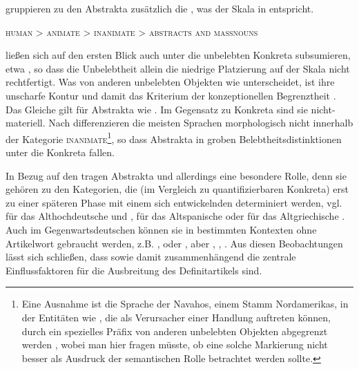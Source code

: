 \textcite[194]{Enger2011} gruppieren zu den Abstrakta  zusätzlich die  , was der Skala in  entspricht. 

\begin{exe}
	\ex \label{ex:einfachbelebt} \textsc{human > animate > inanimate  > abstracts and massnouns}
	\end{exe}
\noindent
{} ließen sich auf den ersten Blick auch unter die unbelebten  Konkreta  subsumieren, etwa , so dass die Unbelebtheit  allein die niedrige Platzierung auf der Skala nicht rechtfertigt. Was  von anderen unbelebten  Objekten wie  unterscheidet, ist ihre unscharfe Kontur und damit das Kriterium der konzeptionellen Begrenztheit \parencite[203--207]{Langacker1987}. Das Gleiche gilt für Abstrakta  wie . Im Gegensatz zu  Konkreta sind sie nicht-materiell. Nach \textcite[197]{Comrie1989} differenzieren die meisten Sprachen morphologisch nicht innerhalb der Kategorie \textsc{inanimate}\footnote{Eine Ausnahme ist die Sprache der Navahos, einem Stamm Nordamerikas, in der Entitäten wie , die als Verursacher einer Handlung auftreten können, durch ein spezielles Präfix von anderen unbelebten  Objekten abgegrenzt  werden \parencite[197]{Comrie1989}, wobei man hier fragen müsste, ob eine solche Markierung nicht besser als Ausdruck der semantischen Rolle   \parencite[73]{Primus2012} betrachtet werden sollte.}, so dass Abstrakta  in groben Belebtheitsdistinktionen unter die Konkreta  fallen.

In Bezug auf den  tragen Abstrakta  und  allerdings eine besondere Rolle, denn sie gehören zu den Kategorien, die (im Vergleich zu quantifizierbaren  Konkreta) erst zu einer späteren Phase mit einem sich entwickelnden  determiniert werden, vgl. für das Althochdeutsche \textcite{Oubouzar1992} und \textcite{Szczepaniak2011}, für das Altspanische \textcite{Company1991}  oder für das Altgriechische \textcite{Napoli2009}. Auch im Gegenwartsdeutschen können sie in bestimmten Kontexten ohne Artikelwort gebraucht werden, z.B. ,   oder  \parencite{DAvis2013}, aber , , . Aus diesen Beobachtungen lässt sich schließen, dass  sowie damit zusammenhängend die  zentrale Einflussfaktoren für die Ausbreitung des Definitartikels  sind. 

